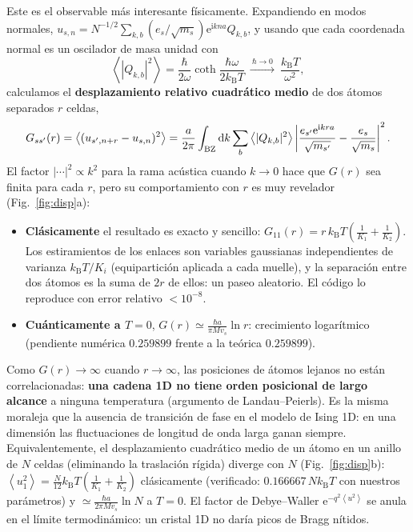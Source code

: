 \documentclass[11pt,a4paper]{article}
\newcommand{\kB}{k_{\mathrm B}}
\newcommand{\dd}{\mathrm{d}}
\newcommand{\ii}{\mathrm{i}}
\newcommand{\ee}{\mathrm{e}}
\newcommand{\avg}[1]{\left\langle #1\right\rangle}
\newcommand{\vs}{v_{s}}
\begin{document}
Este es el observable más interesante físicamente. Expandiendo en modos
normales, $u_{s,n}=N^{-1/2}\sum_{k,b}(e_s/\sqrt{m_s})\ee^{\ii kna}Q_{k,b}$, y
usando que cada coordenada normal es un oscilador de masa unidad con
\begin{equation}
\avg{|Q_{k,b}|^2}=\frac{\hbar}{2\omega}\coth\frac{\hbar\omega}{2\kB T}
\ \xrightarrow{\ \hbar\to0\ }\ \frac{\kB T}{\omega^2},
\end{equation}
calculamos el \textbf{desplazamiento relativo cuadrático medio} de dos átomos
separados $r$ celdas,
\begin{equation}
G_{ss'}(r)=\avg{(u_{s',n+r}-u_{s,n})^2}
=\frac{a}{2\pi}\int_{\rm BZ}\dd k\sum_b\avg{|Q_{k,b}|^2}
\left|\frac{e_{s'}\ee^{\ii kra}}{\sqrt{m_{s'}}}-\frac{e_s}{\sqrt{m_s}}\right|^2 .
\end{equation}
El factor $|\cdots|^2\propto k^2$ para la rama acústica cuando $k\to0$ hace
que $G(r)$ sea finita para cada $r$, pero su comportamiento con $r$ es muy
revelador (Fig.~\ref{fig:disp}a):
\begin{itemize}
\item \textbf{Clásicamente} el resultado es exacto y sencillo:
  $G_{11}(r)=r\,\kB T\left(\frac{1}{K_1}+\frac{1}{K_2}\right)$. Los
  estiramientos de los enlaces son variables gaussianas independientes de
  varianza $\kB T/K_i$ (equipartición aplicada a cada muelle), y la separación
  entre dos átomos es la suma de $2r$ de ellos: un paseo aleatorio. El código
  lo reproduce con error relativo $<10^{-8}$.
\item \textbf{Cuánticamente a $T=0$}, $G(r)\simeq\frac{\hbar a}{\pi M\vs}\ln r$:
  crecimiento logarítmico (pendiente numérica $0.259899$ frente a la teórica
  $0.259899$).
\end{itemize}
Como $G(r)\to\infty$ cuando $r\to\infty$, las posiciones de átomos lejanos no
están correlacionadas: \textbf{una cadena 1D no tiene orden posicional de largo
alcance} a ninguna temperatura (argumento de Landau–Peierls). Es la misma
moraleja que la ausencia de transición de fase en el modelo de Ising 1D: en
una dimensión las fluctuaciones de longitud de onda larga ganan siempre.
Equivalentemente, el desplazamiento cuadrático medio de un átomo en un anillo
de $N$ celdas (eliminando la traslación rígida) diverge con $N$
(Fig.~\ref{fig:disp}b): $\avg{u_1^2}=\frac{N}{12}\kB T\left(\frac1{K_1}+\frac1{K_2}\right)$
clásicamente (verificado: $0.166667\,N\kB T$ con nuestros parámetros) y
$\simeq\frac{\hbar a}{2\pi M\vs}\ln N$ a $T=0$. El factor de Debye–Waller
$\ee^{-q^2\avg{u^2}}$ se anula en el límite termodinámico: un cristal 1D no
daría picos de Bragg nítidos.
\end{document}

